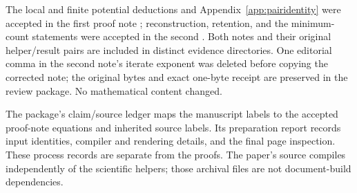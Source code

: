 The local and finite potential deductions and Appendix~\ref{app:pairidentity} were accepted in the first proof note \cite{energy}; reconstruction, retention, and the minimum-count statements were accepted in the second \cite{information}. Both notes and their original helper/result pairs are included in distinct evidence directories. One editorial comma in the second note's iterate exponent was deleted before copying the corrected note; the original bytes and exact one-byte receipt are preserved in the review package. No mathematical content changed.

The package's claim/source ledger maps the manuscript labels to the accepted proof-note equations and inherited source labels. Its preparation report records input identities, compiler and rendering details, and the final page inspection. These process records are separate from the proofs. The paper's source compiles independently of the scientific helpers; those archival files are not document-build dependencies.
